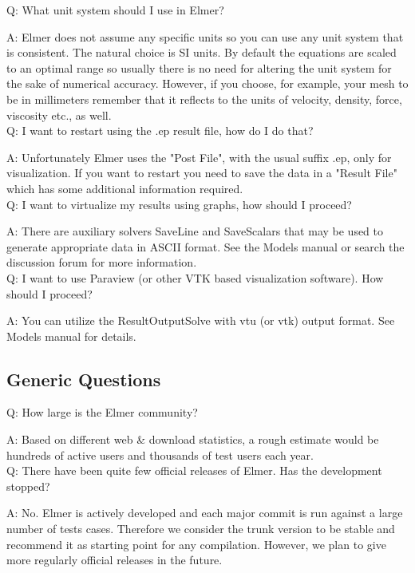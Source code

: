     Q: What unit system should I use in Elmer?

    A: Elmer does not assume any specific units so you can use any unit system that is consistent. The natural choice is SI units. By default the equations are scaled to an optimal range so usually there is no need for altering the unit system for the sake of numerical accuracy. However, if you choose, for example, your mesh to be in millimeters remember that it reflects to the units of velocity, density, force, viscosity etc., as well.\\

    Q: I want to restart using the .ep result file, how do I do that?

    A: Unfortunately Elmer uses the "Post File", with the usual suffix .ep, only for visualization. If you want to restart you need to save the data in a "Result File" which has some additional information required.\\

    Q: I want to virtualize my results using graphs, how should I proceed?

    A: There are auxiliary solvers SaveLine and SaveScalars that may be used to generate appropriate data in ASCII format. See the Models manual or search the discussion forum for more information.\\

    Q: I want to use Paraview (or other VTK based visualization software). How should I proceed?

    A: You can utilize the ResultOutputSolve with vtu (or vtk) output format. See Models manual for details.\\

\subsection{Generic Questions}

    Q: How large is the Elmer community?

    A: Based on different web \& download statistics, a rough estimate would be hundreds of active users and thousands of test users each year.\\

    Q: There have been quite few official releases of Elmer. Has the development stopped?

    A: No. Elmer is actively developed and each major commit is run against a large number of tests cases. Therefore we consider the trunk version to be stable and recommend it as starting point for any compilation. However, we plan to give more regularly official releases in the future.\\

